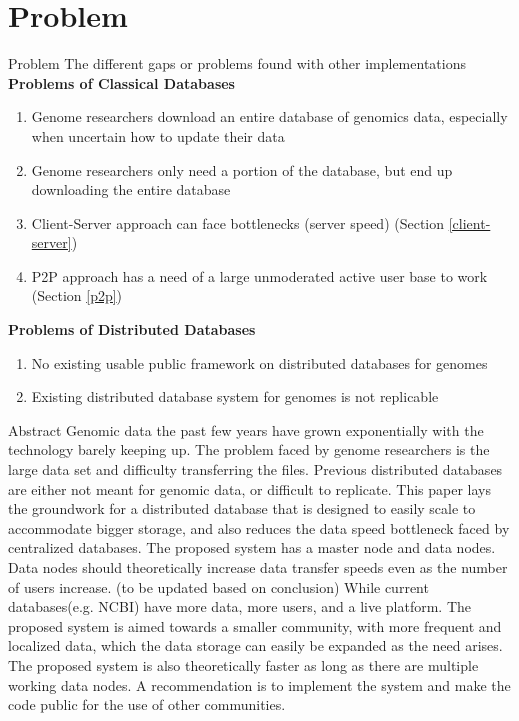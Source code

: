 \documentclass{beamer}
\begin{document}
\section{Problem}
\begin{frame}{Problem}
    The different gaps or problems found with other implementations
    \textbf{Problems of Classical Databases}
    \begin{enumerate}
        \item Genome researchers download an entire database of genomics data, especially when uncertain how to update their data
        \item Genome researchers only need a portion of the database, but end up downloading the entire database
        \item Client-Server approach can face bottlenecks (server speed) (Section \ref{client-server})
        \item P2P approach has a need of a large unmoderated active user base to work (Section \ref{p2p})
    \end{enumerate}
    \textbf{Problems of Distributed Databases}
    
    \begin{enumerate}
    \item No existing usable public framework on distributed databases for genomes
    \item Existing distributed database system for genomes is not replicable 
    \end{enumerate}
\end{frame}

\begin{frame}
\titlepage %
\end{frame}

\begin{frame}{Abstract}
Genomic data the past few years have grown exponentially with the technology barely keeping up. The problem faced by genome researchers is the large data set and difficulty transferring the files. Previous distributed databases are either not meant for genomic data, or difficult to replicate. This paper lays the groundwork for a distributed database that is designed to easily scale to accommodate bigger storage, and also reduces the data speed bottleneck faced by centralized databases. The proposed system has a master node and data nodes. Data nodes should theoretically increase data transfer speeds even as the number of users increase. (to be updated based on conclusion) While current databases(e.g. NCBI) have more data, more users, and a live platform. The proposed system is aimed towards a smaller community, with more frequent and localized data, which the data storage can easily be expanded as the need arises. The proposed system is also theoretically faster as long as there are multiple working data nodes. A recommendation is to implement the system and make the code public for the use of other communities.
\end{frame}
\end{document}
